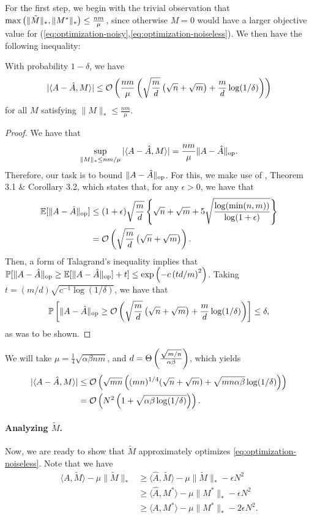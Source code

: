 \documentclass[11pt]{article}
\newcommand{\M}{\tilde{M}}
\newcommand{\A}{\hat{A}}
\newcommand{\oo}{\mathcal{O}}
\begin{document}
For the first step, we begin with the trivial observation that 
$\max\p{\|\M\|_*, \|M^*\|_*} \leq \frac{nm}{\mu}$, since otherwise $M = 0$ 
would have a larger objective value for (\ref{eq:optimization-noisy},\ref{eq:optimization-noiseless}). 
We then have the following inequality:
\begin{lemma}
With probability $1-\delta$, we have
\[ |\langle A-\A, M \rangle| \leq \oo\p{\frac{nm}{\mu}\p{\sqrt{\frac{m}{d}}\p{\sqrt{n} + \sqrt{m}} + \frac{m}{d}\log(1/\delta)}} \]
for all $M$ satisfying $\|M\|_* \leq \frac{nm}{\mu}$.
\end{lemma}
\begin{proof}
We have that 
\[ \sup_{\|M\|_* \leq nm/\mu} |\langle A-\A, M \rangle| = \frac{nm}{\mu}\|A-\A\|_{\op}. \]
Therefore, our task is to bound $\|A-\A\|_{\op}$. For this, we make use of \citet{rmt}, 
Theorem 3.1 \& Corollary 3.2, which states that, for any $\epsilon > 0$, we have that
\begin{align}
\bE[\|A-\A\|_{\op}] &\leq (1+\epsilon)\sqrt{\frac{m}{d}}\left\{\sqrt{n} + \sqrt{m} + 5\sqrt{\frac{\log(\min(n,m))}{\log(1+\epsilon)}}\right\} \\
 &= \oo\p{\sqrt{\frac{m}{d}}\p{\sqrt{n} + \sqrt{m}}}.
\end{align}
Then, a form of Talagrand's inequality implies that
$\bP[\|A-\A\|_{\op} \geq \bE[\|A-\A\|_{\op}] + t] \leq \exp\p{-c\p{td/m}^2}$. 
Taking $t = (m/d)\sqrt{c^{-1}\log(1/\delta)}$, we have that 
\[ \bP\left[\|A-\A\|_{\op} \geq \oo\p{\sqrt{\frac{m}{d}}\p{\sqrt{n} + \sqrt{m}} + \frac{m}{d}\log(1/\delta)}\right] \leq \delta, \]
as was to be shown.
\end{proof}
We will take $\mu = \frac{1}{4}\sqrt{\alpha\beta nm}$, and 
$d = \Theta\left(\frac{\sqrt{m/n}}{\alpha\beta}\right)$, which yields
\begin{align}
|\langle A-\A, M \rangle| &\leq \oo\p{\sqrt{mn}\p{(mn)^{1/4}(\sqrt{n}+\sqrt{m}) + \sqrt{mn\alpha\beta}\log(1/\delta)}} \\
 &= \oo\p{N^2\p{1 + \sqrt{\alpha\beta\log(1/\delta)}}}.
\end{align}

\paragraph{Analyzing $\M$.} Now, we are ready to show that 
$\M$ approximately optimizes \eqref{eq:optimization-noiseless}. Note that we have
\begin{align}
\langle A, \M \rangle - \mu \|\M\|_* &\geq \langle \A, \M \rangle - \mu \|\M\|_* - \epsilon N^2 \\
 &\geq \langle \A, M^* \rangle - \mu \|M^*\|_* - \epsilon N^2 \\
 &\geq \langle A, M^* \rangle - \mu \|M^*\|_* - 2\epsilon N^2.
\end{align}
\end{document}
